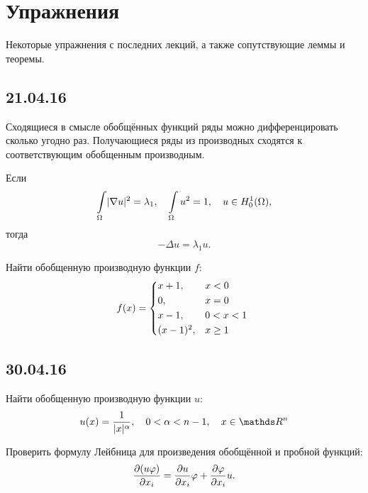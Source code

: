 \chapter{Упражнения}
Некоторые упражнения с последних лекций, а также сопутствующие леммы и теоремы.
\section*{21.04.16}
\begin{lemma}
Сходящиеся в смысле обобщённых функций ряды можно дифференцировать сколько угодно раз. Получающиеся ряды из производных сходятся к соответствующим обобщенным производным.
\end{lemma}

\begin{exercise}
Если $$\int \limits_{\Omega} \abs{\nabla u}^2 = \lambda_1, \quad \int \limits_{\Omega} u^2 = 1, \quad u \in H_0^1(\Omega),$$
тогда $$ - \Delta u = \lambda_1 u.$$
\end{exercise}

\begin{exercise}
Найти обобщенную производную функции $f$:
\begin{gather*}
f(x) =
	\begin{cases*}
		x+1, & $x < 0$ \\
		0, & $x = 0$ \\
		x-1, & $0 < x < 1$ \\
		(x-1)^2, & $x \geq 1$
	\end{cases*}
\end{gather*}
\end{exercise}

\section*{30.04.16}
\begin{exercise}
Найти обобщенную производную функции $u$:
$$u(x) = \frac {1} {\abs{x}^{\alpha}}, \quad 0 < \alpha < n -1, \quad x \in \real^n$$
\end{exercise}

\begin{exercise}
Проверить формулу Лейбница для произведения обобщённой и пробной функций:
$$\pder[(u \varphi)]{x_i} = \pder[u]{x_i} \varphi + \pder[\varphi]{x_i} u.$$
\end{exercise}

